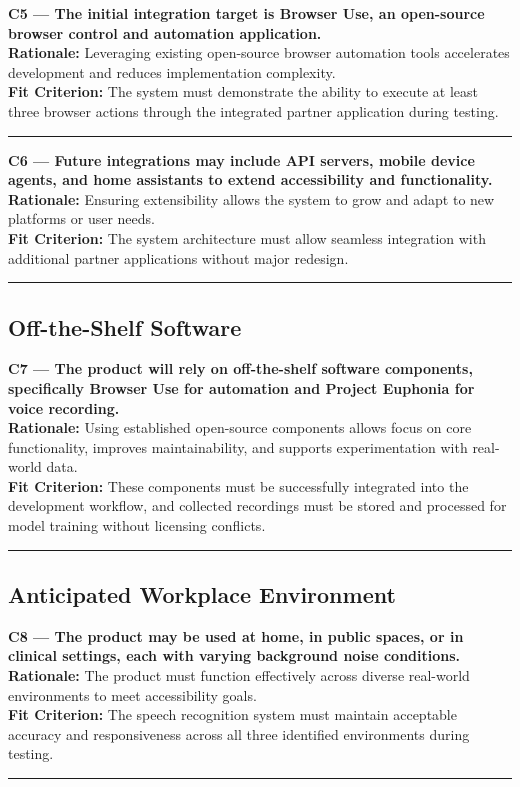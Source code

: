 \documentclass[11pt]{article}
\begin{document}
\noindent\textbf{C5 — The initial integration target is Browser Use, an open-source browser control and automation application.}\\
\textbf{Rationale:} Leveraging existing open-source browser automation tools accelerates development and reduces implementation complexity.\\
\textbf{Fit Criterion:} The system must demonstrate the ability to execute at least three browser actions through the integrated partner application during testing.
\par\noindent\rule{\textwidth}{0.4pt}

\noindent\textbf{C6 — Future integrations may include API servers, mobile device agents, and home assistants to extend accessibility and functionality.}\\
\textbf{Rationale:} Ensuring extensibility allows the system to grow and adapt to new platforms or user needs.\\
\textbf{Fit Criterion:} The system architecture must allow seamless integration with additional partner applications without major redesign.
\par\noindent\rule{\textwidth}{0.4pt}


\subsection{Off-the-Shelf Software}

\noindent\textbf{C7 — The product will rely on off-the-shelf software components, specifically Browser Use for automation and Project Euphonia for voice recording.}\\
\textbf{Rationale:} Using established open-source components allows focus on core functionality, improves maintainability, and supports experimentation with real-world data.\\
\textbf{Fit Criterion:} These components must be successfully integrated into the development workflow, and collected recordings must be stored and processed for model training without licensing conflicts.
\par\noindent\rule{\textwidth}{0.4pt}


\subsection{Anticipated Workplace Environment}

\noindent\textbf{C8 — The product may be used at home, in public spaces, or in clinical settings, each with varying background noise conditions.}\\
\textbf{Rationale:} The product must function effectively across diverse real-world environments to meet accessibility goals.\\
\textbf{Fit Criterion:} The speech recognition system must maintain acceptable accuracy and responsiveness across all three identified environments during testing.
\par\noindent\rule{\textwidth}{0.4pt}
\end{document}
